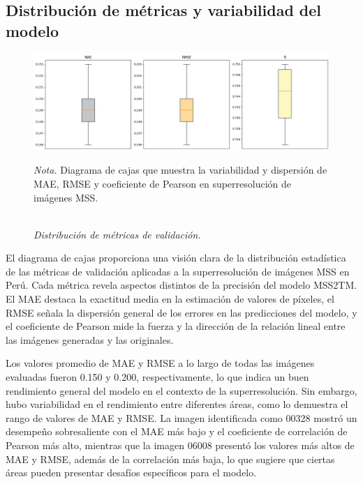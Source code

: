         \subsection{Distribución de métricas y variabilidad del modelo}    

            \begin{figure}[H] 
                \caption{\doublespacing \\ \textit{Distribución de métricas de validación.}} 
                \centering
                \includegraphics[width=1\linewidth]{2_CAPITULO5/IMG/box.jpeg}
                \begin{justify}
                    \textit{Nota.} Diagrama de cajas que muestra la variabilidad y dispersión de MAE, RMSE y coeficiente de Pearson en superresolución de imágenes MSS.
                \end{justify}                    
                \label{modelo}
            \end{figure}


            El diagrama de cajas proporciona una visión clara de la distribución estadística de las métricas de validación aplicadas a la superresolución de imágenes MSS en Perú. Cada métrica revela aspectos distintos de la precisión del modelo MSS2TM. El MAE destaca la exactitud media en la estimación de valores de píxeles, el RMSE señala la dispersión general de los errores en las predicciones del modelo, y el coeficiente de Pearson mide la fuerza y la dirección de la relación lineal entre las imágenes generadas y las originales.

            Los valores promedio de MAE y RMSE a lo largo de todas las imágenes evaluadas fueron 0.150 y 0.200, respectivamente, lo que indica un buen rendimiento general del modelo en el contexto de la superresolución. Sin embargo, hubo variabilidad en el rendimiento entre diferentes áreas, como lo demuestra el rango de valores de MAE y RMSE. La imagen identificada como 00328 mostró un desempeño sobresaliente con el MAE más bajo y el coeficiente de correlación de Pearson más alto, mientras que la imagen 06008 presentó los valores más altos de MAE y RMSE, además de la correlación más baja, lo que sugiere que ciertas áreas pueden presentar desafíos específicos para el modelo.

